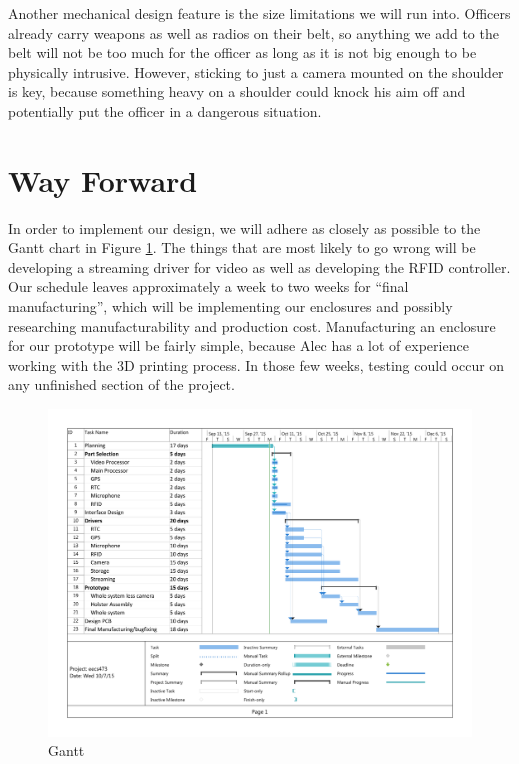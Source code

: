 \documentclass[12pt]{article}
\begin{document}
Another mechanical design feature is the size limitations we will run into.
Officers already carry weapons as well as radios on their belt, so anything we
add to the belt will not be too much for the officer as long as it is not big
enough to be physically intrusive. However, sticking to just a camera mounted
on the shoulder is key, because something heavy on a shoulder could knock his
aim off and potentially put the officer in a dangerous situation. 

\section{Way Forward}

In order to implement our design, we will adhere as closely as possible to the
Gantt chart in Figure \ref{fig:gantt}. The things that are most likely to go
wrong will be developing a streaming driver for video as well as developing the
RFID controller. Our schedule leaves approximately a week to two weeks for
``final manufacturing'', which will be implementing our enclosures and possibly
researching manufacturability and production cost. Manufacturing an enclosure
for our prototype will be fairly simple, because Alec has a lot of experience
working with the 3D printing process. In those few weeks, testing could occur
on any unfinished section of the project. 

\begin{landscape}
\begin{figure}[h!]
    \centering
    \includegraphics[width=1.0\textwidth]{gantt}
    \caption{Gantt}
    \label{fig:gantt}
\end{figure}
\end{landscape}
\end{document}
